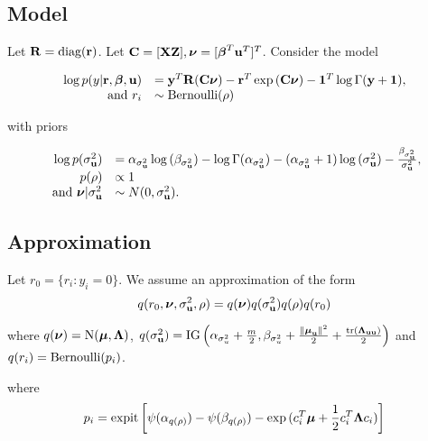 \documentclass{article}[12pt]
\begin{document}


\subsection{Model}
Let ${\bf R} = \text{diag}{({\bf r})}$. Let ${\bf C} = [{\bf X} {\bf Z}], {\boldsymbol \nu} = [{\boldsymbol \beta}^T {\bf u}^T]^T$. Consider the
model

$$
\begin{array}{rl}
\log{p(y|{\bf r}, {\boldsymbol\beta}, {\bf u})} &= {\bf y}^T {\bf R} ({\bf C}{\boldsymbol \nu}) - {\bf r}^T \exp{({\bf C}{\boldsymbol\nu})} - {\bf 1}^T \log{\Gamma{({\bf y}+ {\bf1})}}, \\
\mbox{ and }
r_i &\sim \text{Bernoulli}(\rho) \\
\end{array}
$$

\noindent with priors

$$ 
\begin{array}{rl}
\log{p(\sigma_{\bf u}^2)} &= \alpha_{\sigma_{\bf u}^2} \log{(\beta_{\sigma_{\bf u}^2})} - \log{\Gamma{(\alpha_{\sigma_{\bf u}^2})}} - (\alpha_{\sigma_{\bf u}^2} + 1) \log{(\sigma_{{\bf u}}^2)} - \frac{\beta_{\sigma_{\bf u}^2}}{\sigma_{{\bf u}}^2},\\
p(\rho) &\propto 1 \\
\mbox{ and } {\boldsymbol\nu}|\sigma_{\bf u}^2 &\sim N(0, \sigma_{\bf u}^2). \\
\end{array}
$$

\subsection{Approximation}
Let $r_0 = \{ r_i : y_i = 0 \}$.
We assume an approximation of the form
$$
q(r_0, {\boldsymbol \nu}, \sigma_{{\bf u}}^2, \rho) = q({\boldsymbol \nu}) q(\sigma_{{\bf u}}^2) q(\rho) q(r_0) \\
$$

\noindent where $q({\boldsymbol \nu}) = \mbox{N}({\boldsymbol \mu}, {\boldsymbol \Lambda})$, $q(\sigma_{{\bf u}}^2) = \mbox{IG}\left(\alpha_{\sigma_u^2} + \frac{m}{2}, \beta_{\sigma_u^2} + \frac{\|{\boldsymbol \mu}_{\bf u}\|^2}{2} + \frac{\text{tr}({\boldsymbol \Lambda}_{{\bf u}{\bf u}})}{2}\right)$ \mbox{and } $q(r_i) = \text{Bernoulli} (p_i)$.

\noindent where
$$
p_i = \text{expit} \left[ \psi{(\alpha_{q(\rho)})} - \psi{(\beta_{q(\rho)})} - \exp{(c_i^T{\boldsymbol\mu}+ {\frac{1}{2}}c_i^T {\boldsymbol\Lambda}c_i)} \right]
$$
\end{document}
